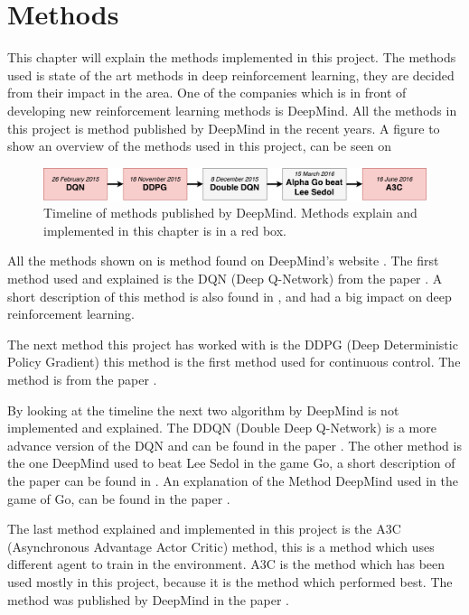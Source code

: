 \chapter{Methods}
\label{chap:projectdef}
This chapter will explain the methods implemented in this project. The methods used is state of the art methods in deep reinforcement learning, they are decided from their impact in the area. One of the companies which is in front of developing new reinforcement learning methods is DeepMind. All the methods in this project is method published by DeepMind in the recent years. A figure to show an overview of the methods used in this project, can be seen on      

\begin{figure}[H]
	\centering
	\includegraphics[width=1.25\textwidth]{Figures/Architecture/Methods_deepmind.pdf}
	\caption{Timeline of methods published by DeepMind. Methods explain and implemented in this chapter is in a red box.   }
	\label{fig:Methods_deepmind}
\end{figure}

All the methods shown on  is method found on DeepMind's website \cite{Publications_Deepmind}. The first method used and explained is the DQN (Deep Q-Network) from the paper \cite{DBLP:journals/corr/MnihKSGAWR13}. A short description of this method is also found in , and had a big impact on deep reinforcement learning.    

The next method this project has worked with is the DDPG (Deep Deterministic Policy Gradient) this method is the first method used for continuous control. The method is from the paper \cite{DBLP:journals/corr/LillicrapHPHETS15}. 

By looking at the timeline the next two algorithm by DeepMind is not implemented and explained. The DDQN (Double Deep Q-Network) is a more advance version of the DQN and can be found in the paper \cite{DBLP:journals/corr/HasseltGS15}. The other method is the one DeepMind used to beat Lee Sedol in the game Go, a short description of the paper can be found in . An explanation of the Method DeepMind used in the game of Go, can be found in the paper \cite{Silver_2016}. 

The last method explained and implemented in this project is the A3C (Asynchronous Advantage Actor Critic) method, this is a method which uses different agent to train in the environment. A3C is the method which has been used mostly in this project, because it is the method which performed best. The method was published by DeepMind in the paper \cite{DBLP:journals/corr/MnihBMGLHSK16}.  

